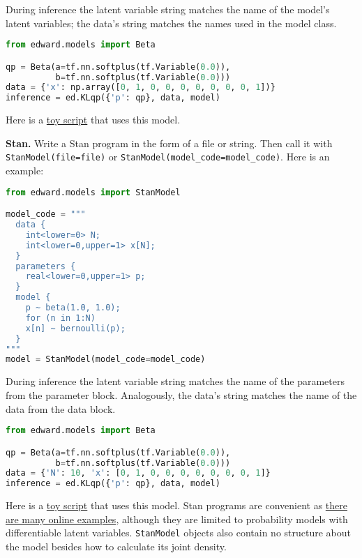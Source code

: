 During inference the latent variable string matches the name of the
model's latent variables; the data's string matches the names used in
the model class.

\begin{lstlisting}[language=Python]
from edward.models import Beta

qp = Beta(a=tf.nn.softplus(tf.Variable(0.0)),
          b=tf.nn.softplus(tf.Variable(0.0)))
data = {'x': np.array([0, 1, 0, 0, 0, 0, 0, 0, 0, 1])}
inference = ed.KLqp({'p': qp}, data, model)
\end{lstlisting}

Here is a
\href{https://github.com/blei-lab/edward/blob/master/examples/np_beta_bernoulli.py}
{toy script}
that uses this model.

\textbf{Stan.}
Write a Stan program in the form of a file or string. Then
call it with \texttt{StanModel(file=file)} or
\texttt{StanModel(model_code=model_code)}. Here is an example:

\begin{lstlisting}[language=Python]
from edward.models import StanModel

model_code = """
  data {
    int<lower=0> N;
    int<lower=0,upper=1> x[N];
  }
  parameters {
    real<lower=0,upper=1> p;
  }
  model {
    p ~ beta(1.0, 1.0);
    for (n in 1:N)
    x[n] ~ bernoulli(p);
  }
"""
model = StanModel(model_code=model_code)
\end{lstlisting}

During inference the latent variable string matches the name of the
parameters from the parameter block. Analogously, the data's string
matches the name of the data from the data block.

\begin{lstlisting}[language=Python]
from edward.models import Beta

qp = Beta(a=tf.nn.softplus(tf.Variable(0.0)),
          b=tf.nn.softplus(tf.Variable(0.0)))
data = {'N': 10, 'x': [0, 1, 0, 0, 0, 0, 0, 0, 0, 1]}
inference = ed.KLqp({'p': qp}, data, model)
\end{lstlisting}

Here is a
\href{https://github.com/blei-lab/edward/blob/master/examples/stan_beta_bernoulli.py}
{toy script}
that uses this model. Stan programs are convenient as
\href{https://github.com/stan-dev/example-models/wiki}
{there are many online examples},
although they are limited to probability models with differentiable
latent variables. \texttt{StanModel} objects also contain no structure about
the model besides how to calculate its joint density.

